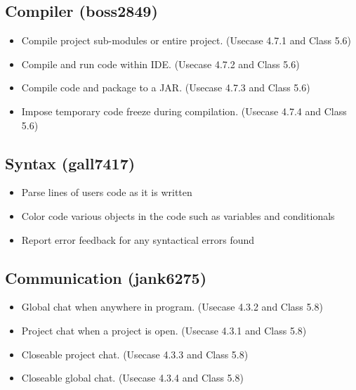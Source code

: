 \documentclass[11pt]{report}
\begin{document}
    \subsection{Compiler (boss2849)}
        \begin{itemize}
            \item Compile project sub-modules or entire project. (Usecase 4.7.1 and Class 5.6)
            \item Compile and run code within IDE. (Usecase 4.7.2 and Class 5.6)
            \item Compile code and package to a JAR. (Usecase 4.7.3 and Class 5.6)
            \item Impose temporary code freeze during compilation. (Usecase 4.7.4 and Class 5.6)
        \end{itemize}
    \subsection{Syntax (gall7417)}
        \begin{itemize}
            \item Parse lines of users code as it is written
            \item Color code various objects in the code such as variables and conditionals
            \item Report error feedback for any syntactical errors found
        \end{itemize}
    \subsection{Communication (jank6275)}
        \begin{itemize}
            \item Global chat when anywhere in program. (Usecase 4.3.2 and Class 5.8)
            \item Project chat when a project is open. (Usecase 4.3.1 and Class 5.8)
            \item Closeable project chat. (Usecase 4.3.3 and Class 5.8)
            \item Closeable global chat. (Usecase 4.3.4 and Class 5.8)
        \end{itemize}
\end{document}
